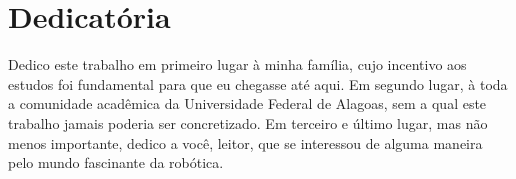 \chapter*{Dedicatória}
\vfill
\begin{flushleft}
    Dedico este trabalho em primeiro lugar à minha família, cujo incentivo 
    aos estudos foi fundamental para que eu chegasse até aqui. Em segundo lugar, 
    à toda a comunidade acadêmica da Universidade Federal de Alagoas, sem a qual este trabalho 
    jamais poderia ser concretizado. Em terceiro e último lugar, mas não menos importante, 
    dedico a você, leitor, que se interessou de alguma maneira pelo mundo fascinante da robótica.
\end{flushleft}
\vfill